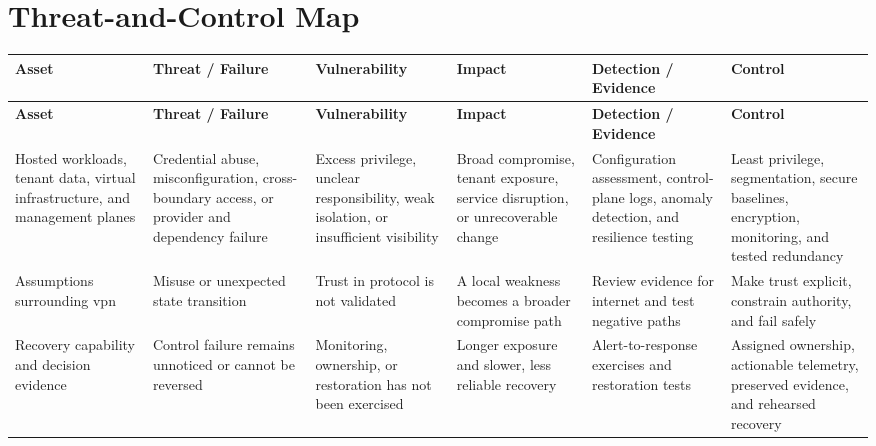 \documentclass[11pt,letterpaper]{article}
\begin{document}
\section*{Threat-and-Control Map}
\begingroup\scriptsize\setlength{\tabcolsep}{2pt}
\begin{longtable}{>{\raggedright\arraybackslash}p{}>{\raggedright\arraybackslash}p{}>{\raggedright\arraybackslash}p{}>{\raggedright\arraybackslash}p{}>{\raggedright\arraybackslash}p{}>{\raggedright\arraybackslash}p{}}
\toprule\rowcolor{Navy}\color{white}\textbf{Asset} & \color{white}\textbf{Threat / Failure} & \color{white}\textbf{Vulnerability} & \color{white}\textbf{Impact} & \color{white}\textbf{Detection / Evidence} & \color{white}\textbf{Control}\\\midrule
\endfirsthead
\toprule\rowcolor{Navy}\color{white}\textbf{Asset} & \color{white}\textbf{Threat / Failure} & \color{white}\textbf{Vulnerability} & \color{white}\textbf{Impact} & \color{white}\textbf{Detection / Evidence} & \color{white}\textbf{Control}\\\midrule
\endhead
Hosted workloads, tenant data, virtual infrastructure, and management planes & Credential abuse, misconfiguration, cross-boundary access, or provider and dependency failure & Excess privilege, unclear responsibility, weak isolation, or insufficient visibility & Broad compromise, tenant exposure, service disruption, or unrecoverable change & Configuration assessment, control-plane logs, anomaly detection, and resilience testing & Least privilege, segmentation, secure baselines, encryption, monitoring, and tested redundancy\\\midrule
Assumptions surrounding vpn & Misuse or unexpected state transition & Trust in protocol is not validated & A local weakness becomes a broader compromise path & Review evidence for internet and test negative paths & Make trust explicit, constrain authority, and fail safely\\\midrule
Recovery capability and decision evidence & Control failure remains unnoticed or cannot be reversed & Monitoring, ownership, or restoration has not been exercised & Longer exposure and slower, less reliable recovery & Alert-to-response exercises and restoration tests & Assigned ownership, actionable telemetry, preserved evidence, and rehearsed recovery\\\midrule
\bottomrule
\end{longtable}
\endgroup
\end{document}
